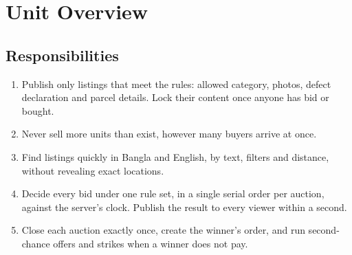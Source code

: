 \documentclass[11pt,a4paper]{article}
\begin{document}
\section{Unit Overview}

\subsection{Responsibilities}
\begin{enumerate}[nosep]
  \item Publish only listings that meet the rules: allowed category, photos, defect declaration and parcel details. Lock their content once anyone has bid or bought.
  \item Never sell more units than exist, however many buyers arrive at once.
  \item Find listings quickly in Bangla and English, by text, filters and distance, without revealing exact locations.
  \item Decide every bid under one rule set, in a single serial order per auction, against the server's clock. Publish the result to every viewer within a second.
  \item Close each auction exactly once, create the winner's order, and run second-chance offers and strikes when a winner does not pay.
\end{enumerate}
\end{document}
